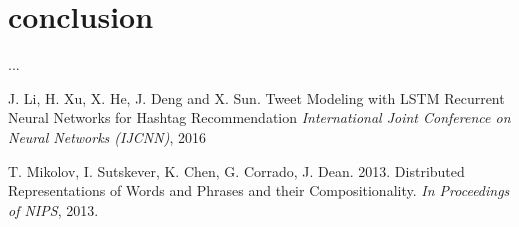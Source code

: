 \documentclass[journal, a4paper]{IEEEtran}
\begin{document}
\section{conclusion}
...







\begin{thebibliography}{5}

	J. Li, H. Xu, X. He, J. Deng and X. Sun. Tweet Modeling with LSTM Recurrent Neural
	Networks for Hashtag Recommendation {\em International Joint Conference on Neural Networks (IJCNN)}, 2016

	T. Mikolov, I. Sutskever, K. Chen, G. Corrado, J. Dean. 2013. Distributed Representations of Words and Phrases and their Compositionality. {\em In Proceedings of NIPS}, 2013.

\end{thebibliography}

\end{document}
